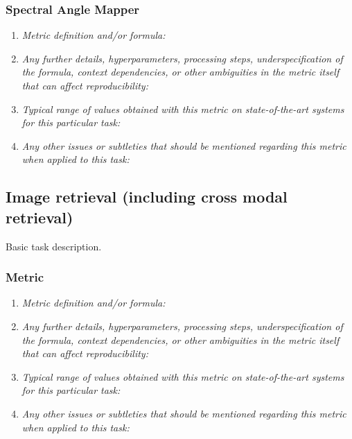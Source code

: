 \documentclass[a4paper,11pt]{article}
\begin{document}
        \subsubsection{Spectral Angle Mapper}
            \begin{enumerate}[label=\alph*.]
                \item \textit{Metric definition and/or formula:}
                \bigskip
                \item \textit{Any further details, hyperparameters, processing steps, underspecification of the formula, context dependencies, or other ambiguities in the metric itself that can affect reproducibility:}
                \bigskip
                \item \textit{Typical range of values obtained with this metric on state-of-the-art systems for this particular task:}
                \bigskip
                \item \textit{Any other issues or subtleties that should be mentioned regarding this metric when applied to this task:}
                \bigskip
            \end{enumerate}


    \subsection{Image retrieval (including cross modal retrieval)}
    Basic task description.
    \subsubsection{Metric}
        \begin{enumerate}[label=\alph*.]
            \item \textit{Metric definition and/or formula:}
            \bigskip
            \item \textit{Any further details, hyperparameters, processing steps, underspecification of the formula, context dependencies, or other ambiguities in the metric itself that can affect reproducibility:}
            \bigskip
            \item \textit{Typical range of values obtained with this metric on state-of-the-art systems for this particular task:}
            \bigskip
            \item \textit{Any other issues or subtleties that should be mentioned regarding this metric when applied to this task:}
            \bigskip
        \end{enumerate}
\end{document}
